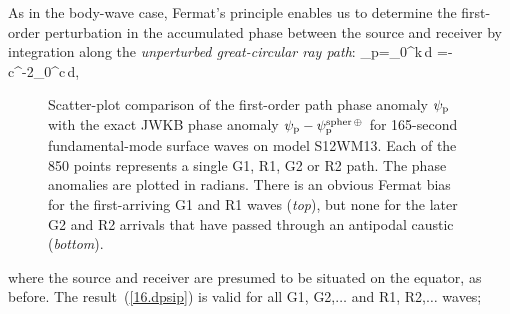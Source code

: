 As in the body-wave case, Fermat's principle enables us to
determine the first-order perturbation in the accumulated
phase between the source and receiver by integration
along the {\em unperturbed great-circular ray path\/}:
\eq \label{16.dpsip}
\delta\psi_{\rm p}=\int_0^\Delta\delta k\,d\phi
=-\om c^{-2}\int_0^\Delta\delta c\,d\phi,
\en
\begin{figure}[!b]
\begin{center}
\end{center}
\caption[phase]{\label{fig:16.phase}
Scatter-plot comparison of the first-order path
phase anomaly $\psi_{\rm p}$ with the exact JWKB phase
anomaly $\psi_{\rm p}-\psi_{\rm p}^{\rm spher\,\oplus}$
for 165-second fundamental-mode surface waves on model S12WM13.
Each of the 850 points represents a single G1, R1, G2 or R2 path.
The phase anomalies are plotted in radians. There is an obvious
Fermat bias for the first-arriving G1 and R1 waves ({\em top\/}),
but none for the later G2 and R2 arrivals that have passed through
an antipodal caustic ({\em bottom\/}).}
\end{figure}
where the source and receiver are presumed to be situated
on the equator, as before.  The result~(\ref{16.dpsip})
is valid for all G1, G2,\hspace{0.2mm}$\ldots$ and R1, R2,\hspace{0.2mm}$\ldots$ waves;
